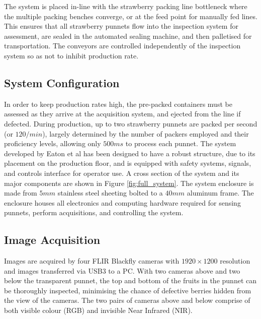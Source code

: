 \documentclass[conference]{IEEEtran}
\begin{document}
The system is placed in-line with the strawberry packing line bottleneck where the multiple packing benches converge, or at the feed point for manually fed lines. This ensures that all strawberry punnets flow into the inspection system for assessment, are sealed in the automated sealing machine, and then palletised for transportation. The conveyors are controlled independently of the inspection system so as not to inhibit production rate. 


\subsection{System Configuration}

In order to keep production rates high, the pre-packed containers must be assessed as they arrive at the acquisition system, and ejected from the line if defected. During production, up to two strawberry punnets are packed per second (or $120/min$), largely determined by the number of packers employed and their proficiency levels, allowing only $500ms$ to process each punnet. The system developed by Eaton et al \cite{eaton1} has been designed to have a robust structure, due to its placement on the production floor, and is equipped with safety systems, signals, and controls interface for operator use. A cross section of the system and its major components are shown in Figure \ref{fig:full_system}. The system enclosure is made from $5mm$ stainless steel sheeting bolted to a $40mm$ aluminum frame. The enclosure houses all electronics and computing hardware required for sensing punnets, perform acquisitions, and controlling the system. 


\subsection{Image Acquisition}

Images are acquired by four FLIR Blackfly cameras with $1920\times 1200$ resolution and images transferred via USB3 to a PC. With two cameras above and two below the transparent punnet, the top and bottom of the fruits in the punnet can be thoroughly inspected, minimising the chance of defective berries hidden from the view of the cameras. The two pairs of cameras above and below comprise of both visible colour (RGB) and invisible Near Infrared (NIR).
\end{document}

